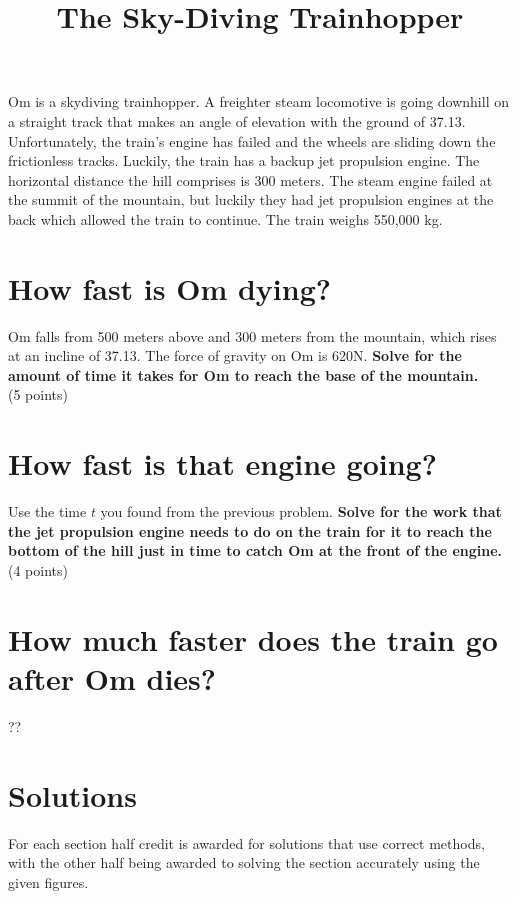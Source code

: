 \documentclass{article}
\title{\vspace{-3em}The Sky-Diving Trainhopper\vspace{-3em}}
\begin{document}
\fontsize{14}{16}\selectfont

\maketitle

Om is a skydiving trainhopper. A freighter steam locomotive is going downhill on a straight track that makes an angle of elevation with the ground of 37.13\degree. Unfortunately, the train's engine has failed and the wheels are sliding down the frictionless tracks. Luckily, the train has a backup jet propulsion engine. The horizontal distance the hill comprises is 300 meters. The steam engine failed at the summit of the mountain, but luckily they had jet propulsion engines at the back which allowed the train to continue. The train weighs 550,000 kg.

\section{How fast is Om dying?} 
Om falls from 500 meters above and 300 meters from the mountain, which rises at an incline of 37.13\degree. The force of gravity on Om is 620N. \textbf{Solve for the amount of time it takes for Om to reach the base of the mountain.} \\
(5 points)

\section{How fast is that engine going?}
Use the time $t$ you found from the previous problem. \textbf{Solve for the work that the jet propulsion engine needs to do on the train for it to reach the bottom of the hill just in time to catch Om at the front of the engine.} \\
(4 points)

\section{How much faster does the train go after Om dies?}
??

\pagebreak

\section{Solutions}

For each section half credit is awarded for solutions that use correct methods, with the other half being awarded to solving the section accurately using the given figures.
\end{document}
